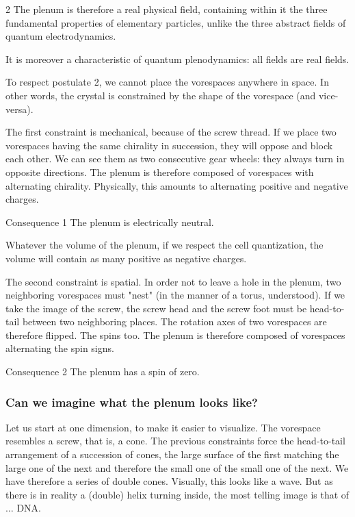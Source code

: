 \begin{multicols}{2}
	The plenum is therefore a real physical field, containing within it 
	the three fundamental properties of elementary particles, 
	unlike the three abstract fields of quantum 
	electrodynamics.
	
	It is moreover a characteristic of quantum plenodynamics: 
	all fields are real fields.
	
	To respect postulate 2, we cannot place the vorespaces 
	anywhere in space. In other words, the crystal is 
	constrained by the shape of the vorespace (and vice-versa).
	
	The first constraint is mechanical, because of the screw thread. If we 
	place two vorespaces having the same chirality in succession, they will 
	oppose and block each other. We can see them as two consecutive 
	gear wheels: they always turn in opposite directions. The 
	plenum is therefore composed of vorespaces with alternating chirality. 
	Physically, this amounts to alternating positive and 
	negative charges.
	
	\begin{mybox}[breakable,colback=blue!10, colbacktitle=pkcolor]{Consequence 1}
		The plenum is electrically neutral.
	\end{mybox}
	\medskip
	
	Whatever the volume of the plenum, if we respect the cell 
	quantization, the volume will contain as many positive as 
	negative charges.
	\bigskip
	
	The second constraint is spatial. In order not to leave a hole in 
	the plenum, two neighboring vorespaces must "nest" (in the 
	manner of a torus, understood). If we take the image of the screw, the 
	screw head and the screw foot must be head-to-tail between two neighboring 
	places. The rotation axes of two vorespaces are therefore flipped. 
	The spins too. The plenum is therefore composed of vorespaces alternating 
	the spin signs.
	
	\begin{mybox}[breakable,colback=blue!10, colbacktitle=pkcolor]{Consequence 2}
		The plenum has a spin of zero.
	\end{mybox}
	
	\subsubsection*{Can we imagine what the plenum looks like?}
	
	Let us start at one dimension, to make it easier to 
	visualize. The vorespace resembles a screw, that is, a cone. 
	The previous constraints force the head-to-tail arrangement of a 
	succession of cones, the large surface of the first matching the large one 
	of the next and therefore the small one of the small one of the next. We have therefore a 
	series of double cones. Visually, this looks like a wave. But 
	as there is in reality a (double) helix turning inside, 
	the most telling image is that of$\dots$ DNA.
	

\end{multicols}
